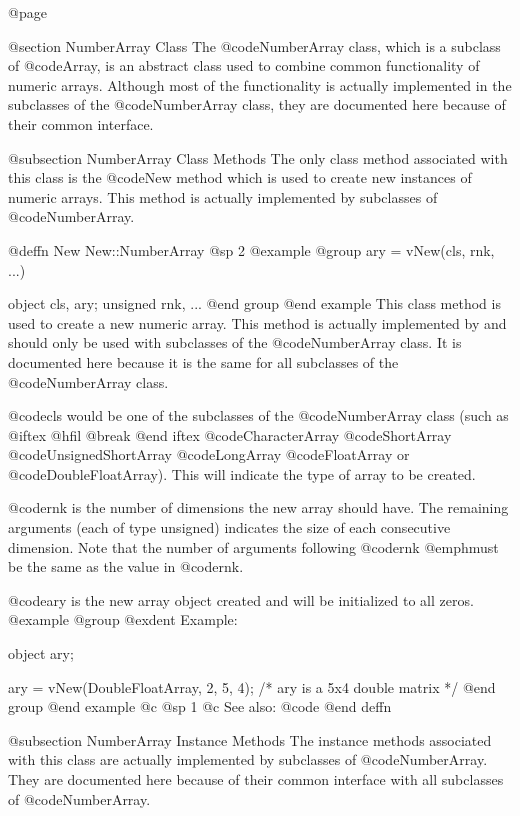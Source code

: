 @page

@section NumberArray Class
The @code{NumberArray} class, which is a subclass of @code{Array}, is an
abstract class used to combine common functionality of numeric arrays.
Although most of the functionality is actually implemented in the
subclasses of the @code{NumberArray} class, they are documented here
because of their common interface.


@subsection NumberArray Class Methods
The only class method associated with this class is the @code{New} method
which is used to create new instances of numeric arrays.  This method
is actually implemented by subclasses of @code{NumberArray}.








@deffn {New} New::NumberArray
@sp 2
@example
@group
ary = vNew(cls, rnk, ...)

object    cls, ary;
unsigned  rnk, ...
@end group
@end example
This class method is used to create a new numeric array.  This method
is actually implemented by and should only be used with subclasses of
the @code{NumberArray} class.  It is documented here because it is the
same for all subclasses of the @code{NumberArray} class.

@code{cls} would be one of the subclasses of the @code{NumberArray}
class (such as 
@iftex
@hfil @break 
@end iftex
@code{CharacterArray} @code{ShortArray}
@code{UnsignedShortArray} @code{LongArray} @code{FloatArray} or
@code{DoubleFloatArray}).  This will indicate the type of array to be
created.

@code{rnk} is the number of dimensions the new array should have.
The remaining arguments (each of type unsigned) indicates the size of
each consecutive dimension.  Note that the number of arguments following
@code{rnk} @emph{must} be the same as the value in @code{rnk}.

@code{ary} is the new array object created and will be initialized to all
zeros.
@example
@group
@exdent Example:

object  ary;

ary = vNew(DoubleFloatArray, 2, 5, 4);
/*  ary is a 5x4 double matrix  */
@end group
@end example
@c @sp 1
@c See also:  @code{}
@end deffn






@subsection NumberArray Instance Methods
The instance methods associated with this class are actually implemented
by subclasses of @code{NumberArray}.  They are documented here because
of their common interface with all subclasses of @code{NumberArray}.

